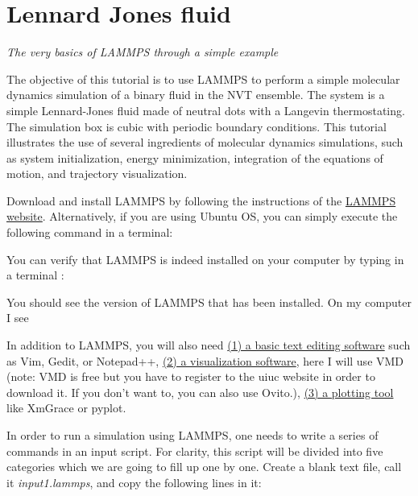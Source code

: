\chapter{Lennard Jones fluid}
\label{lennard-jones-label}

\noindent \textit{The very basics of LAMMPS through a simple example}


\vspace{0.5cm} \noindent The objective of this tutorial is to use
LAMMPS to perform a simple molecular dynamics simulation
of a binary fluid in the NVT ensemble. The system is a simple Lennard-Jones fluid
made of neutral dots with a Langevin thermostating. The
simulation box is cubic with periodic boundary conditions.
This tutorial illustrates the use of several ingredients of
molecular dynamics simulations, such as system initialization,
energy minimization, integration of the equations of motion,
and trajectory visualization.

\vspace{0.5cm} \noindent Download and install LAMMPS by following the instructions of the \href{https://lammps.sandia.gov}{LAMMPS website}.
Alternatively, if you are using Ubuntu OS, you can simply execute the
following command in a terminal:

\vspace{0.5cm} \noindent You can verify that LAMMPS is indeed installed on your
computer by typing in a terminal :

\vspace{0.5cm} \noindent You should see the version of LAMMPS that has been
installed. On my computer I see

\vspace{0.5cm} \noindent In addition to LAMMPS, you will also need \href{https://help.gnome.org/users/gedit/stable/}{(1) a basic text editing software}
such as Vim, Gedit, or Notepad++, \href{https://www.ks.uiuc.edu/Research/vmd/}{(2) a visualization software}, here I
will use VMD (note: VMD is free but you have to register to
the uiuc website in order to download it. If you don't want
to, you can also use Ovito.), \href{https://plasma-gate.weizmann.ac.il/Grace/}{(3) a plotting tool} like
XmGrace or pyplot.

\vspace{0.5cm} \noindent In order to run a simulation using LAMMPS, one needs to
write a series of commands in an input script. For clarity,
this script will be divided into five categories which we are going to
fill up one by one. Create a blank text file, call it
\textit{input1.lammps}, and copy the following lines in it:

